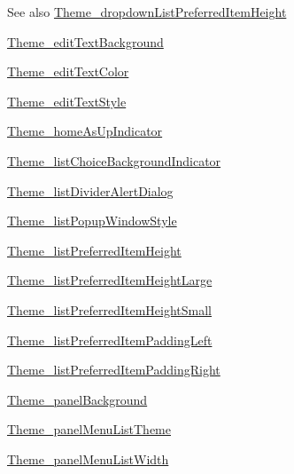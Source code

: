 \begin{DoxySeeAlso}{See also}
\hyperlink{classcheck_1_1test_1_1_r_1_1styleable_a4b8e66fe596de4f95de89a3fb97316d8}{Theme\+\_\+dropdown\+List\+Preferred\+Item\+Height} 

\hyperlink{classcheck_1_1test_1_1_r_1_1styleable_ab28653ef2c423653f679a95b9eb7e7fa}{Theme\+\_\+edit\+Text\+Background} 

\hyperlink{classcheck_1_1test_1_1_r_1_1styleable_ab8022b2bf8b784e17530f17a05186fa2}{Theme\+\_\+edit\+Text\+Color} 

\hyperlink{classcheck_1_1test_1_1_r_1_1styleable_ac901bbf20d4b5142cbf9b03381ae438b}{Theme\+\_\+edit\+Text\+Style} 

\hyperlink{classcheck_1_1test_1_1_r_1_1styleable_aae9299f409cd1528cb1b807fe0eecbb0}{Theme\+\_\+home\+As\+Up\+Indicator} 

\hyperlink{classcheck_1_1test_1_1_r_1_1styleable_a26daf114808db4e2394c40f88131eb51}{Theme\+\_\+list\+Choice\+Background\+Indicator} 

\hyperlink{classcheck_1_1test_1_1_r_1_1styleable_ab74d6b5271031da6a2f14e60706211e7}{Theme\+\_\+list\+Divider\+Alert\+Dialog} 

\hyperlink{classcheck_1_1test_1_1_r_1_1styleable_a43cec80892caa72b4d7185ffbe3950f9}{Theme\+\_\+list\+Popup\+Window\+Style} 

\hyperlink{classcheck_1_1test_1_1_r_1_1styleable_ab8d78a772c83aad6fa1b020d5f846f67}{Theme\+\_\+list\+Preferred\+Item\+Height} 

\hyperlink{classcheck_1_1test_1_1_r_1_1styleable_a6b792de713c77b5d2897ffd143ea5d6a}{Theme\+\_\+list\+Preferred\+Item\+Height\+Large} 

\hyperlink{classcheck_1_1test_1_1_r_1_1styleable_a59adeb7f43ab4c55c41858885f6d3085}{Theme\+\_\+list\+Preferred\+Item\+Height\+Small} 

\hyperlink{classcheck_1_1test_1_1_r_1_1styleable_ae246fdddad967741c0a3101714a40ef3}{Theme\+\_\+list\+Preferred\+Item\+Padding\+Left} 

\hyperlink{classcheck_1_1test_1_1_r_1_1styleable_a784a9d6670f4b87a95a04b867b4b4e7b}{Theme\+\_\+list\+Preferred\+Item\+Padding\+Right} 

\hyperlink{classcheck_1_1test_1_1_r_1_1styleable_a07ce7800e0d7dc1fce4e70ecde15e5a5}{Theme\+\_\+panel\+Background} 

\hyperlink{classcheck_1_1test_1_1_r_1_1styleable_a1d6dd9a183e0165672173da100f35f74}{Theme\+\_\+panel\+Menu\+List\+Theme} 

\hyperlink{classcheck_1_1test_1_1_r_1_1styleable_ac3385a441e77f588205019797ec7c36f}{Theme\+\_\+panel\+Menu\+List\+Width} 


\end{DoxySeeAlso}
